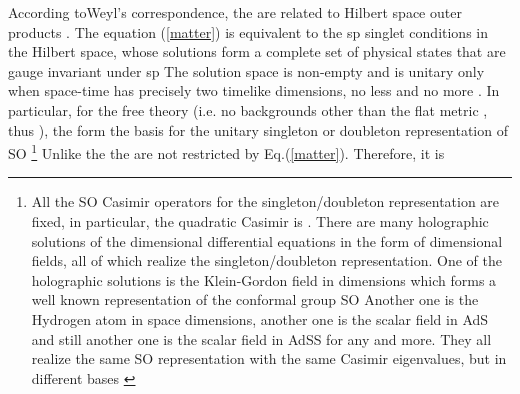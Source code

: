 \documentclass[a4paper,12pt]{article}
\begin{document}
According toWeyl's correspondence, the \coordHE{} are related to Hilbert space outer products \coordHE{}. The \myHighlight{$\varphi $}\coordHE{}
equation (\ref{matter}) is equivalent to the sp\coordHE{} singlet
conditions in the Hilbert space, \coordHE{} whose solutions
form a complete set of physical states \coordHE{}
that are gauge invariant under sp\coordHE{} The solution space \coordHE{} is non-empty and is unitary only when
space-time has precisely two timelike dimensions, no less and no more \cite
{field2T}\cite{NCSp}. In particular, for the free theory (i.e. no
backgrounds other than the flat metric \coordHE{}, thus \coordHE{}), the \coordHE{} form the basis for the
unitary singleton or doubleton representation of SO\coordHE{}%
\footnote{%
All the SO\coordHE{} Casimir operators for the singleton/doubleton
representation are fixed, in particular, the quadratic Casimir is \coordHE{}. There are many
holographic solutions of the \coordHE{} dimensional differential equations \coordHE{} in the form of \coordHE{} dimensional
fields, all of which realize the singleton/doubleton representation. One of
the holographic solutions is the Klein-Gordon field in \coordHE{} dimensions which
forms a well known representation of the conformal group SO\coordHE{} Another one is the Hydrogen atom in \coordHE{} space dimensions,
another one is the scalar field in AdS\coordHE{} and still another one is the
scalar field in AdS\coordHE{}S\coordHE{} for any \coordHE{} and more. They
all realize the same SO\coordHE{} representation with the same
Casimir eigenvalues, but in different bases \cite{field2T}\coordHE{}} \coordHE{} Unlike
the \coordHE{} the \coordHE{} are not restricted by Eq.(\ref{matter}). Therefore, it is
\end{document}
